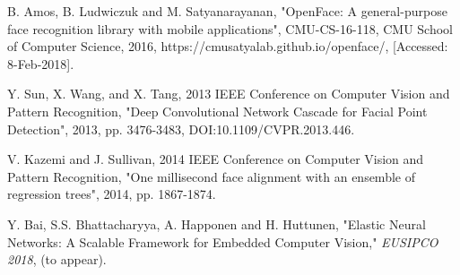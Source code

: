 \documentclass[conference]{IEEEtran}
\begin{document}
\begin{thebibliography}{00}
B. Amos, B. Ludwiczuk and M. Satyanarayanan, "OpenFace: A general-purpose face recognition library with mobile applications", CMU-CS-16-118, CMU School of Computer Science, 2016, https://cmusatyalab.github.io/openface/, [Accessed: 8-Feb-2018].




  
 Y. Sun, X. Wang, and X. Tang, 2013 IEEE Conference on Computer Vision and Pattern Recognition, "Deep Convolutional Network Cascade for Facial Point Detection", 2013, pp. 3476-3483, DOI:10.1109/CVPR.2013.446.


V. Kazemi and J. Sullivan, 2014 IEEE Conference on Computer Vision and Pattern Recognition, "One millisecond face alignment with an ensemble of regression trees", 2014, pp. 1867-1874.

 Y. Bai, S.S. Bhattacharyya, A. Happonen and H. Huttunen, "Elastic Neural Networks: A Scalable Framework for Embedded Computer Vision," \textit{EUSIPCO 2018}, (to appear). 



\end{thebibliography}
\end{document}
